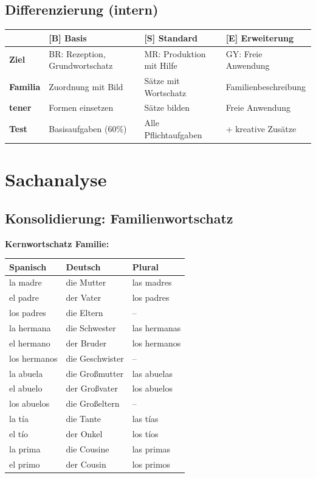 \documentclass[11pt,a4paper]{article}
\newcommand{\B}{\textcolor{basis}{\textbf{[B]}}}
\newcommand{\Std}{\textcolor{standard}{\textbf{[S]}}}
\newcommand{\E}{\textcolor{erweiterung}{\textbf{[E]}}}
\begin{document}
\subsection{Differenzierung (intern)}
\begin{tabular}{|l|p{3.5cm}|p{3.5cm}|p{3.5cm}|}
\hline
& \B{} \textbf{Basis} & \Std{} \textbf{Standard} & \E{} \textbf{Erweiterung} \\
\hline
\textbf{Ziel} & BR: Rezeption, Grundwortschatz & MR: Produktion mit Hilfe & GY: Freie Anwendung \\
\hline
\textbf{Familia} & Zuordnung mit Bild & Sätze mit Wortschatz & Familienbeschreibung \\
\hline
\textbf{tener} & Formen einsetzen & Sätze bilden & Freie Anwendung \\
\hline
\textbf{Test} & Basisaufgaben (60\%) & Alle Pflichtaufgaben & + kreative Zusätze \\
\hline
\end{tabular}

\section{Sachanalyse}

\subsection{Konsolidierung: Familienwortschatz}

\textbf{Kernwortschatz Familie:}
\begin{center}
\begin{tabular}{|l|l|l|}
\hline
\textbf{Spanisch} & \textbf{Deutsch} & \textbf{Plural} \\
\hline
la madre & die Mutter & las madres \\
el padre & der Vater & los padres \\
los padres & die Eltern & -- \\
la hermana & die Schwester & las hermanas \\
el hermano & der Bruder & los hermanos \\
los hermanos & die Geschwister & -- \\
la abuela & die Großmutter & las abuelas \\
el abuelo & der Großvater & los abuelos \\
los abuelos & die Großeltern & -- \\
la tía & die Tante & las tías \\
el tío & der Onkel & los tíos \\
la prima & die Cousine & las primas \\
el primo & der Cousin & los primos \\
\hline
\end{tabular}
\end{center}
\end{document}
